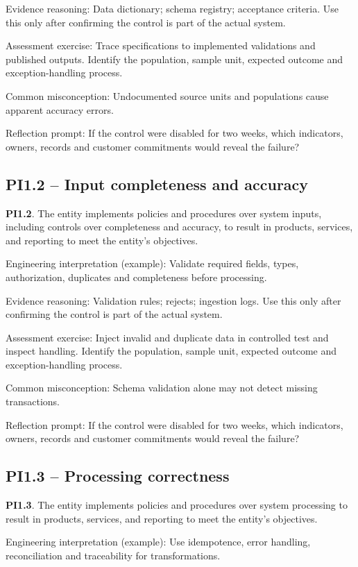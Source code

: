 \documentclass[10pt,oneside]{report}
\begin{document}
Evidence reasoning: Data dictionary; schema registry; acceptance criteria. Use this only after confirming the control is part of the actual system.

Assessment exercise: Trace specifications to implemented validations and published outputs. Identify the population, sample unit, expected outcome and exception-handling process.

Common misconception: Undocumented source units and populations cause apparent accuracy errors.

Reflection prompt: If the control were disabled for two weeks, which indicators, owners, records and customer commitments would reveal the failure?

\subsection{PI1.2 -- Input completeness and accuracy}
\begin{aicpabox}
\textbf{PI1.2}. The entity implements policies and procedures over system inputs, including controls over completeness and accuracy, to result in products, services, and reporting to meet the entity's objectives.\par{}
\end{aicpabox}
Engineering interpretation (example): Validate required fields, types, authorization, duplicates and completeness before processing.

Evidence reasoning: Validation rules; rejects; ingestion logs. Use this only after confirming the control is part of the actual system.

Assessment exercise: Inject invalid and duplicate data in controlled test and inspect handling. Identify the population, sample unit, expected outcome and exception-handling process.

Common misconception: Schema validation alone may not detect missing transactions.

Reflection prompt: If the control were disabled for two weeks, which indicators, owners, records and customer commitments would reveal the failure?

\subsection{PI1.3 -- Processing correctness}
\begin{aicpabox}
\textbf{PI1.3}. The entity implements policies and procedures over system processing to result in products, services, and reporting to meet the entity's objectives.\par{}
\end{aicpabox}
Engineering interpretation (example): Use idempotence, error handling, reconciliation and traceability for transformations.
\end{document}
